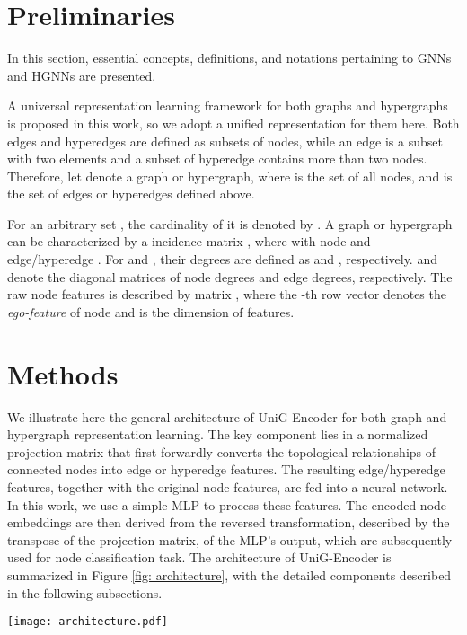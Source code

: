 \documentclass[review]{elsarticle}
\begin{document}
\section{Preliminaries}
In this section, essential concepts, definitions, and notations pertaining to GNNs and HGNNs are presented.

A universal representation learning framework for both graphs and hypergraphs is proposed in this work, so we adopt a unified representation for them here. Both edges and hyperedges are defined as subsets of nodes, while an edge is a subset with two elements and a subset of hyperedge contains more than two nodes. Therefore, let  denote a graph or hypergraph, where  is the set of all nodes, and  is the set of edges or hyperedges defined above.

For an arbitrary set , the cardinality of it is denoted by . A graph or hypergraph  can be characterized by a  incidence matrix , where  with node  and edge/hyperedge . For  and , their degrees are defined as  and , respectively.  and  denote the diagonal matrices of node degrees and edge degrees, respectively. The raw node features is described by matrix , where the -th row vector  denotes the {\it ego-feature} of node  and  is the dimension of features.

\section{Methods}

We illustrate here the general architecture of UniG-Encoder for both graph and hypergraph representation learning. The key component lies in a normalized projection matrix that first forwardly converts the topological relationships of connected nodes into edge or hyperedge features. The resulting edge/hyperedge features, together with the original node features, are fed into a neural network. In this work, we use a simple MLP to process these features. The encoded node embeddings are then derived from the reversed transformation, described by the transpose of the projection matrix, of the MLP's output, which are subsequently used for node classification task. The architecture of UniG-Encoder is summarized in Figure \ref{fig: architecture}, with the detailed components described in the following subsections.

\begin{figure*}[htbp]
  \centering
  \texttt{[image: architecture.pdf]}
  \caption{\textbf{The architecture of UniG-Encoder.} The architecture starts with a forward transformation of the topological relationships of connected nodes into edge or hyperedge features via a normalized projection matrix. The resulting edge/hyperedge features, together with the original node features, are fed into a neural network. The encoded node embeddings are then derived from the reversed transformation, described by the transpose of the projection matrix, of the network's output, which can be further used for tasks such as node classification. Notably, the MLP can be substituted by advanced neural networks such as the Transformer.}
  \label{fig: architecture}
\end{figure*}
\end{document}
